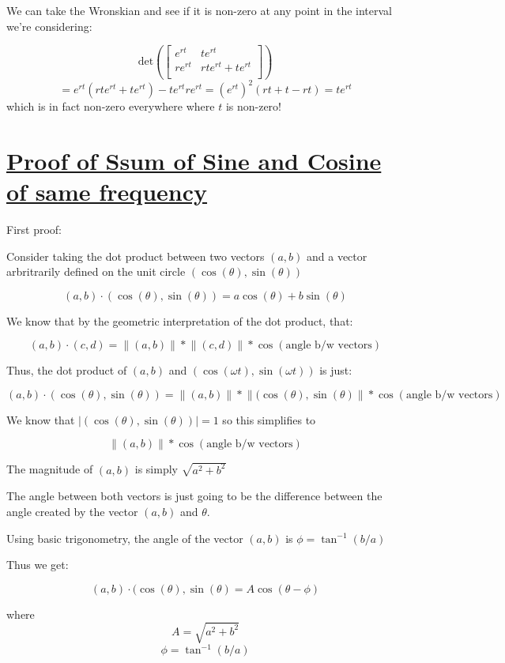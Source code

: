 \documentclass{report}
\begin{document}
We can take the Wronskian and see if it is non-zero at any point in the interval we're considering:


$$
    \text{det}\left(\begin{bmatrix}
        e^{rt} & te^{rt}\\
        re^{rt} & rte^{rt}+ te^{rt} \\
    \end{bmatrix}\right)
$$
$$
    = e^{rt}(rte^{rt}+te^{rt}) - te^{rt}re^{rt}
    = (e^{rt})^2(rt+t-rt)
    = te^{rt}
$$
which is in fact non-zero everywhere where $t$ is non-zero!

\section{\hyperref[th:sinPlusCosin]{Proof of Ssum of Sine and Cosine of same frequency}}
\label{sec:prSinPlusCosin}
First proof:

Consider taking the dot product between two vectors $(a,b)$ and a vector arbritrarily defined on the unit circle $(\cos(\theta),\sin(\theta))$

$$(a,b)\cdot(\cos(\theta),\sin(\theta)) = a\cos(\theta) + b\sin(\theta)$$

We know that by the geometric interpretation of the dot product, that:

$$(a,b)\cdot(c,d) = \lVert(a,b)\rVert*\lVert(c,d)\rVert*\cos(\text{angle b/w vectors})$$

Thus, the dot product of $(a,b)$ and $(\cos(\omega t),\sin(\omega t))$ is just:

$$(a,b)\cdot(\cos(\theta),\sin(\theta)) = \lVert(a,b)\rVert*\lVert(\cos(\theta),\sin(\theta)\rVert*\cos(\text{angle b/w vectors})$$

We know that $\lvert(\cos(\theta),\sin(\theta))\rvert =1$ so this simplifies to 

$$\lVert(a,b)\rVert*\cos(\text{angle b/w vectors})$$

The magnitude of $(a,b)$ is simply $\sqrt{a^2+b^2}$

The angle between both vectors is just going to be the difference between the angle created by the vector $(a,b)$ and $\theta$. 

Using basic trigonometry, the angle of the vector $(a,b)$ is $\phi = \tan^{-1}(b/a)$

Thus we get:

$$(a,b)\cdot(\cos(\theta),\sin(\theta) = A\cos(\theta - \phi)$$

where
$$A = \sqrt{a^2+b^2}$$
$$\phi = \tan^{-1}(b/a)$$
\end{document}
